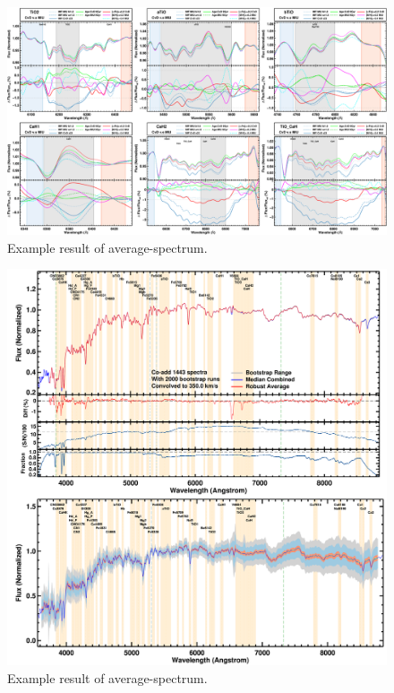 \documentclass[preprint]{aastex}
\begin{document}
\begin{CJK*}{UTF8}{gbsn}
\clearpage
{}
\begin{figure}
    \centering 
    \includegraphics[width=19cm]{figure/fig5.png}
    \caption{
    Example result of average-spectrum. 
    }
    \label{figure:5}
\end{figure}



\clearpage
{}
\begin{figure}
    \centering 
    \includegraphics[width=17cm]{figure/figA1.png}
    \caption{
    Example result of average-spectrum. 
    }
    \label{figure:A1}
\end{figure}


\end{CJK*}
\end{document}
